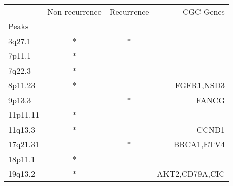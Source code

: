 \begin{tabular}{lccr}
\toprule
{} & Non-recurrence & Recurrence &       CGC Genes \\
Peaks    &                &            &                 \\
\midrule
3q27.1   &              * &          * &                 \\
7p11.1   &              * &            &                 \\
7q22.3   &              * &            &                 \\
8p11.23  &              * &            &      FGFR1,NSD3 \\
9p13.3   &                &          * &           FANCG \\
11p11.11 &              * &            &                 \\
11q13.3  &              * &            &           CCND1 \\
17q21.31 &                &          * &      BRCA1,ETV4 \\
18p11.1  &              * &            &                 \\
19q13.2  &              * &            &  AKT2,CD79A,CIC \\
\bottomrule
\end{tabular}
